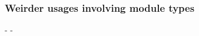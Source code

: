 \subsubsection{Weirder usages involving module types\label{weirder-usages-involving-module-types}}%
\begin{description}\kern-\topsep
\makeatletter\advance\@topsepadd-\topsep\makeatother%
\item[{\hyperref[Ocamlary-IncludeInclude1-IncludeInclude2_M]{\ocamlinlinecode{\ocamlinlinecode{IncludeInclude1.\allowbreak{}IncludeInclude2\_\allowbreak{}M}}[p\pageref*{Ocamlary-IncludeInclude1-IncludeInclude2_M}]}}]{}%
\item[{\hyperref[Ocamlary-Dep4-X]{\ocamlinlinecode{\ocamlinlinecode{Dep4.\allowbreak{}X}}[p\pageref*{Ocamlary-Dep4-X}]}}]{}\end{description}%
